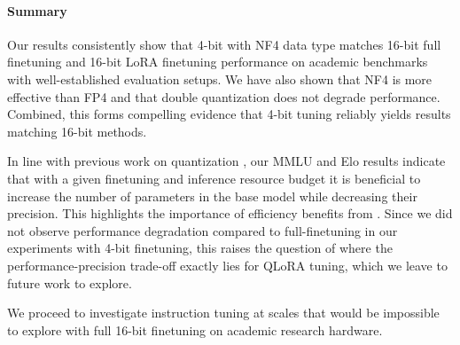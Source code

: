 \paragraph{Summary} Our results consistently show that 4-bit \method with NF4 data type matches 16-bit full finetuning and 16-bit LoRA finetuning performance on academic benchmarks with well-established evaluation setups. We have also shown that NF4 is more effective than FP4 and that double quantization does not degrade performance. Combined, this forms compelling evidence that 4-bit \method tuning reliably yields results matching 16-bit methods. 

In line with previous work on quantization \citep{dettmers2022case}, our MMLU and Elo results indicate that with a given finetuning and inference resource budget it is beneficial to increase the number of parameters in the base model while decreasing their precision. This highlights the importance of efficiency benefits from \method. Since we did not observe performance degradation compared to full-finetuning in our experiments with 4-bit finetuning, this raises the question of where the performance-precision trade-off exactly lies for QLoRA tuning, which we leave to future work to explore.

We proceed to investigate instruction tuning at scales that would be impossible to explore with full 16-bit finetuning on academic research hardware.

